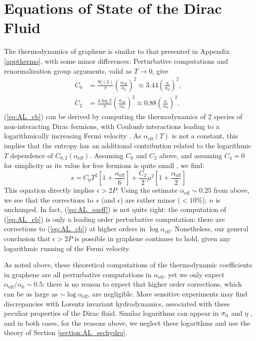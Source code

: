 \section{Equations of State of the Dirac Fluid}\label{apprun}
The thermodynamics of graphene is similar to that presented in Appendix \ref{appthermo}, with some minor differences.    Perturbative computations and renormalization group arguments, valid as $T\rightarrow 0$, give \cite{vafek_anomalous_2007, sheehy_quantum_2007} \begin{subequations}\label{eq:AL_cb}\begin{align}
C_0 &= \frac{9\zeta(3)}{\pi} \left(\frac{\alpha_{\mathrm{eff}}}{\alpha_0}\right)^2 \approx 3.44 \left(\frac{\alpha}{\alpha_0}\right)^2, \\
C_2 &= \frac{4\log 2}{\pi}  \left(\frac{\alpha_{\mathrm{eff}}}{\alpha_0}\right)^2 \approx 0.88 \left(\frac{\alpha}{\alpha_0}\right)^2.
\end{align}\end{subequations}
(\ref{eq:AL_cb}) can be derived by computing the thermodynamics of 2 species of non-interacting Dirac fermions, with Coulomb interactions leading to a logarithmically increasing Fermi velocity \cite{vafek_anomalous_2007, sheehy_quantum_2007}.    As $\alpha_{\mathrm{eff}}(T)$ is not a constant, this implies that the entropy has an additional contribution related to the logarithmic $T$ dependence of $C_{0,2}(\alpha_{\mathrm{eff}})$.   Assuming $C_0$ and $C_2$ above, and assuming $C_4=0$ for simplicity as its value for free fermions is quite small \cite{muller_collective_2008}, we find: \begin{equation}
   s = C_0 T^2 \left[1 + \frac{\alpha_{\mathrm{eff}}}{6}\right]+ \frac{C_2}{2}\mu^2\left[1 + \frac{\alpha_{\mathrm{eff}}}{2}\right]  \label{eq:AL_saeff}
   \end{equation}
This equation directly implies $\epsilon>2P$.   Using the estimate $\alpha_{\mathrm{eff}}\sim 0.25$ from above, we see that the corrections to $s$ (and $\epsilon$) are rather minor ($<10$\%);  $n$ is unchanged.   In fact,  (\ref{eq:AL_saeff}) is not quite right: the computation of (\ref{eq:AL_cb}) is only a leading order perturbative computation:  there are corrections to (\ref{eq:AL_cb}) at higher orders in $\log \alpha_{\mathrm{eff}}$.    Nonetheless, our general conclusion that $\epsilon>2P$ is possible in graphene continues to hold, given any logarithmic running of the Fermi velocity.

As noted above, these theoretical computations of the thermodynamic coefficients in graphene are all perturbative computations in $\alpha_{\mathrm{eff}}$,  yet we only expect $\alpha_{\mathrm{eff}}/\alpha_0\sim 0.5$:  there is no reason to expect that higher order corrections, which can be as large as $\sim \log \alpha_{\mathrm{eff}}$, are negligible.  More sensitive experiments may find discrepancies with Lorentz invariant hydrodynamics, associated with these peculiar properties of the Dirac fluid.   Similar logarithms can appear in $\sigma_{\textsc{q}}$ \cite{muller_quantum-critical_2008} and $\eta$ \cite{muller_graphene:_2009}, and in both cases, for the reasons above, we neglect these logarithms and use the theory of Section \ref{section:AL_sechydro}.
   

